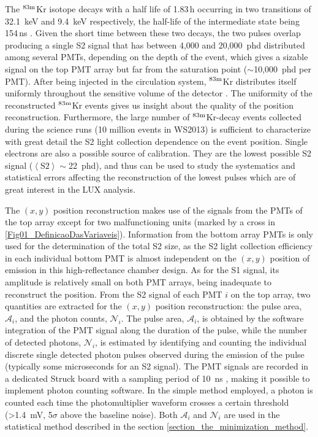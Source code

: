 \documentclass[a4paper,11pt]{article}
\begin{document}
 The ${}^{\rm 83m}$Kr isotope decays with a half life of 1.83\,h occurring in two transitions of 32.1~keV and 9.4~keV respectively, the half-life of the intermediate state being 154\,ns \cite{hertel2015}. Given the short time between these two decays, the two pulses overlap producing a single S2 signal that has between 4,000 and 20,000~phd distributed among several PMTs, depending on the depth of the event, which gives a sizable signal on the top PMT array but far from the saturation point ($\sim$10,000~phd per PMT). After being injected in the circulation system, ${}^{\rm 83m}$Kr distributes itself uniformly throughout the sensitive volume of the detector \cite{PhysRevC.80.045809}. The uniformity of the reconstructed ${}^{\rm 83m}$Kr events gives us insight about the quality of the position reconstruction. Furthermore, the large number of ${}^{\rm 83m}$Kr-decay events collected during the science runs (10 million events in WS2013) is sufficient to characterize with great detail the S2 light collection dependence on the event position. Single electrons are also a possible source of calibration. They are the lowest possible S2 signal ($\left<{\mathrm{S2}}\right>\sim$22~phd),  and thus can be used to study the systematics and statistical errors affecting the reconstruction of the lowest pulses which are of great interest in the LUX analysis.

The $(x, y)$ position reconstruction makes use of the signals from the PMTs of the top array except for two malfunctioning units (marked by a cross in \cref{Fig01_DefinicaoDasVariaveis}). Information from the bottom array PMTs is only used for the determination of the total S2 size, as the S2 light collection efficiency in each individual bottom PMT is almost independent on the $(x,y)$ position of emission in this high-reflectance chamber design. As for the S1 signal, its amplitude is relatively small on both PMT arrays, being inadequate to reconstruct the position. From the S2 signal of each PMT $i$ on the top array, two quantities are extracted for the $(x, y)$ position reconstruction:  the pulse area, $\mathcal{A}_i$, and the photon counts, $\mathcal{N}_i$. The pulse area, $\mathcal{A}_i$, is obtained by the software integration of the PMT signal along the duration of the pulse, while the number of detected photons, $\mathcal{N}_i$, is estimated by identifying and counting the individual discrete single detected photon pulses observed during the emission of the pulse (typically some microseconds for an S2 signal). The PMT signals are recorded in a dedicated Struck board with a sampling period of 10~ns \cite{LUXDAQ2012}, making it possible to implement photon counting  software. In the simple method employed, a photon is counted each time the photomultiplier waveform crosses a certain threshold (>1.4~mV, 5$\sigma$ above the baseline noise). Both $\mathcal{A}_i$ and $\mathcal{N}_i$ are used in the statistical method described in the section \ref{section_the_minimization_method}.
\end{document}
